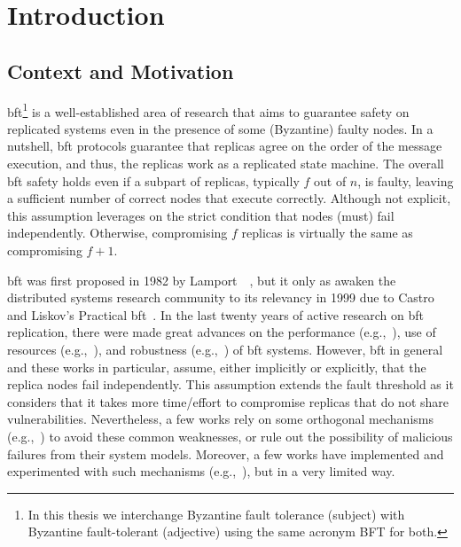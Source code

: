 \chapter{Introduction}
\label{chap:introduction}

\section{Context and Motivation}
\gls{bft}\footnote{In this thesis we interchange Byzantine fault tolerance (subject) with Byzantine fault-tolerant (adjective) using the same acronym BFT for both.} is a well-established area of research that aims to guarantee safety on replicated systems even in the presence of some (Byzantine) faulty nodes.
In a nutshell, \gls{bft} protocols guarantee that replicas agree on the order of the message execution, and thus, the replicas work as a replicated state machine.
The overall \gls{bft} safety holds even if a subpart of replicas, typically $f$ out of $n$, is faulty, leaving a sufficient number of correct nodes that execute correctly.
Although not explicit, this assumption leverages on the strict condition that nodes (must) fail independently.
Otherwise, compromising $f$ replicas is virtually the same as compromising $f+1$.


\gls{bft} was first proposed in 1982 by Lamport~\etal{}~\cite{Lamport:1982}, but it only as awaken the distributed systems research community to its relevancy in 1999 due to Castro and Liskov's Practical \gls{bft}~\cite{Castro:1999}. 
In the last twenty years of active research on \gls{bft} replication, there were made great advances on the performance (e.g.,~\cite{Kotla:2010,Aublin:2015,Behl:2015}), use of resources (e.g.,~\cite{Yin:2003,Wood:2011,Veronese:2013,Liu:2016,Behl:2017}), and robustness (e.g.,~\cite{Amir:2011,Bessani:2014,Clement:2009b}) of \gls{bft} systems.
However, \gls{bft} in general and these works in particular, assume, either implicitly or explicitly, that the replica nodes fail independently. 
This assumption extends the fault threshold as it considers that it takes more time/effort to compromise replicas that do not share vulnerabilities.
Nevertheless, a few works rely on some orthogonal mechanisms (e.g.,~\cite{Roeder:2010,Chen:1995}) to avoid these common weaknesses, or rule out the possibility of malicious failures from their system models.
Moreover, a few works have implemented and experimented with such mechanisms (e.g.,~\cite{Rodrigues:2001,Roeder:2010,Amir:2011}), but in a very limited way.


